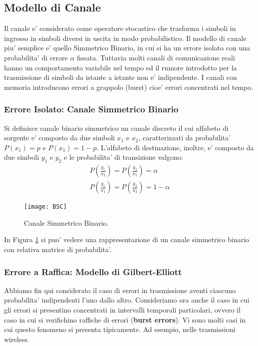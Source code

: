 \documentclass[a4paper,11pt]{article}
\theoremstyle{definition}
\begin{document}
\subsection{Modello di Canale}
Il canale e' considerato come operatore stocastico che trasforma i simboli in ingresso in simboli diversi in uscita in modo probabilistico.
Il modello di canale piu' semplice e' quello Simmetrico Binario, in cui si ha un errore isolato con una probabilita' di errore $\alpha$ fissata. Tuttavia molti canali di comunicazione reali hanno un comportamento variabile nel tempo ed il rumore introdotto per la trasmissione di simboli da istante a istante non e' indipendente. I canali con memoria introducono errori a grappolo (burst) cioe' errori concentrati nel tempo.
\subsubsection{Errore Isolato: Canale Simmetrico Binario}
Si definisce canale binario simmetrico un canale discreto il cui alfabeto di sorgente e' composto da due simboli $x_1$ e $x_2$, caratterizzati da probabilita' $P(x_1)=p$ e $P(x_1)=1-p$. L'alfabeto di destinazione, inoltre, e' composto da due simboli $y_1$ e $y_2$ e le probabilita' di transizione valgono:
\begin{gather*}
P(\frac{y_1}{x_2})=P(\frac{y_2}{x_1}) = \alpha \\
P(\frac{y_1}{x_1})=P(\frac{y_2}{x_2}) = 1-\alpha
\end{gather*}

\begin{figure}
	\centering
	\texttt{[image: BSC]}
	\caption{Canale Simmetrico Binario. }
	\label{fig:bsc}
\end{figure}

In Figura \ref{fig:bsc} si puo' vedere una rappresentazione di un canale simmetrico binario con relativa matrice di probabilita'.

\subsubsection{Errore a Raffica: Modello di Gilbert-Elliott}
Abbiamo fin qui considerato il caso di errori in trasmissione aventi ciascuno
probabilita' indipendenti l'uno dallo altro. Consideriamo ora anche il caso in cui gli errori si presentino concentrati in intervalli temporali particolari, ovvero
il caso in cui si verifichino raffiche di errori (\textbf{burst errors}). Vi sono molti casi in cui questo fenomeno si presenta tipicamente. Ad esempio, nelle trasmissioni wireless.
\end{document}
